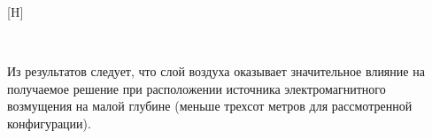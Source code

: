 \documentclass[a4paper,14pt]{article}
\makeatletter
\renewenvironment{figure}[1][\fps@figure]{
  \edef\@tempa{\noexpand\@float{figure}[#1]}
  \@tempa
  \addtocounter{foofigure}{1}
}{
  \end@float
}
\renewcommand{\Re}{\mathop{\mathrm{Re}}\nolimits}
\makeatother
\begin{document}
\begin{figure}[H]
	\centering
	~
	\caption{$\Re(\mathbf{E}_y)$ по линии $y=0$, $z=-610$, глубина (а) 200 м и (б) 300 м}
	\label{fig:res1:200_300}
\end{figure}

Из результатов следует, что слой воздуха оказывает значительное влияние на получаемое решение при расположении источника электромагнитного возмущения на малой глубине (меньше трехсот метров для рассмотренной конфигурации).

\end{document}
